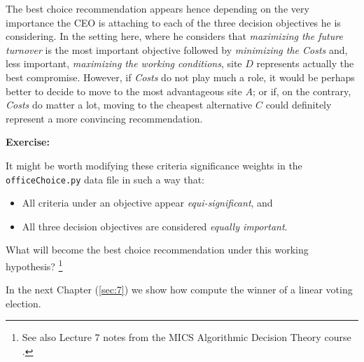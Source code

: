The best choice recommendation appears hence depending on the very importance the CEO is attaching to each of the three decision objectives he is considering. In the setting here, where he considers that \emph{maximizing the future turnover} is the most important objective followed by \emph{minimizing the Costs} and, less important, \emph{maximizing the working conditions}, site $D$ represents actually the best compromise. However, if \emph{Costs} do not play much a role, it would be perhaps better to decide to move to the most advantageous site $A$; or if, on the contrary, \emph{Costs} do matter a lot, moving to the cheapest alternative $C$ could definitely represent a more convincing recommendation. 

\noindent \textbf{Exercise:}

\noindent It might be worth modifying these criteria significance weights in the \texttt{officeChoice.py} data file in such a way that:
\begin{itemize}
\item All criteria under an objective appear \emph{equi-significant}, and
\item All three decision objectives are considered \emph{equally important}.
\end{itemize}
What will become the best choice recommendation under this working hypothesis? \footnote{See also Lecture 7 notes from the MICS Algorithmic Decision Theory course \citep{ADT-L7}.} 

In the next Chapter (\ref{sec:7}) we show how compute the winner of a linear voting election.

\clearpage


%
